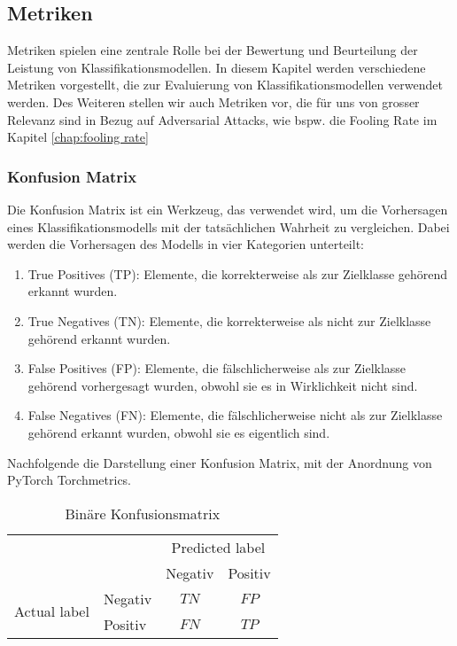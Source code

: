 \subsection{Metriken}
Metriken spielen eine zentrale Rolle bei der Bewertung und Beurteilung der Leistung von Klassifikationsmodellen. In diesem Kapitel werden verschiedene Metriken vorgestellt, die zur Evaluierung von Klassifikationsmodellen verwendet werden. Des Weiteren stellen wir auch Metriken vor, die für uns von grosser Relevanz sind in Bezug auf Adversarial Attacks, wie bspw. die Fooling Rate im Kapitel \ref{chap:fooling rate}

\subsubsection{Konfusion Matrix}

Die Konfusion Matrix ist ein Werkzeug, das verwendet wird, um die Vorhersagen eines Klassifikationsmodells mit der tatsächlichen Wahrheit zu vergleichen. Dabei werden die Vorhersagen des Modells in vier Kategorien unterteilt:

\begin{enumerate}
    \item True Positives (TP): Elemente, die korrekterweise als zur Zielklasse gehörend erkannt wurden.
    \item True Negatives (TN): Elemente, die korrekterweise als nicht zur Zielklasse gehörend erkannt wurden.
    \item False Positives (FP): Elemente, die fälschlicherweise als zur Zielklasse gehörend vorhergesagt wurden, obwohl sie es in Wirklichkeit nicht sind.
    \item False Negatives (FN): Elemente, die fälschlicherweise nicht als zur Zielklasse gehörend erkannt wurden, obwohl sie es eigentlich sind.
\end{enumerate}

Nachfolgende die Darstellung einer Konfusion Matrix, mit der Anordnung von PyTorch Torchmetrics. 

\begin{table}[h]
    \centering
    \begin{tabular}{l|l|c|c|}
        \multicolumn{2}{c}{}&\multicolumn{2}{c}{Predicted label}\\
        \cline{3-4}
        \multicolumn{2}{c|}{}&Negativ&Positiv\\
        \cline{2-4}
        \multirow{2}{*}{Actual label}& Negativ & $TN$ & $FP$\\
        \cline{2-4}
        & Positiv & $FN$ & $TP$\\
        \cline{2-4}
    \end{tabular}
    \label{tab:conftable}
    \caption{Binäre Konfusionsmatrix}
\end{table}

